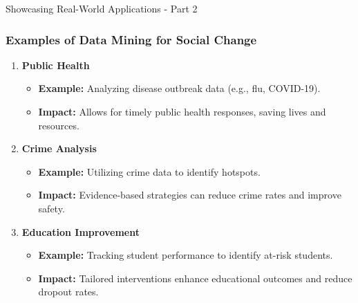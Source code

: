 \documentclass[aspectratio=169]{beamer}
\begin{document}
\begin{frame}[fragile]{Showcasing Real-World Applications - Part 2}
    \frametitle{Examples of Data Mining for Social Change}
    
    \begin{enumerate}
        \item \textbf{Public Health}
            \begin{itemize}
                \item \textbf{Example:} Analyzing disease outbreak data (e.g., flu, COVID-19).
                \item \textbf{Impact:} Allows for timely public health responses, saving lives and resources.
            \end{itemize}

        \item \textbf{Crime Analysis}
            \begin{itemize}
                \item \textbf{Example:} Utilizing crime data to identify hotspots.
                \item \textbf{Impact:} Evidence-based strategies can reduce crime rates and improve safety.
            \end{itemize}

        \item \textbf{Education Improvement}
            \begin{itemize}
                \item \textbf{Example:} Tracking student performance to identify at-risk students.
                \item \textbf{Impact:} Tailored interventions enhance educational outcomes and reduce dropout rates.
            \end{itemize}
    \end{enumerate}
\end{frame}
\end{document}
